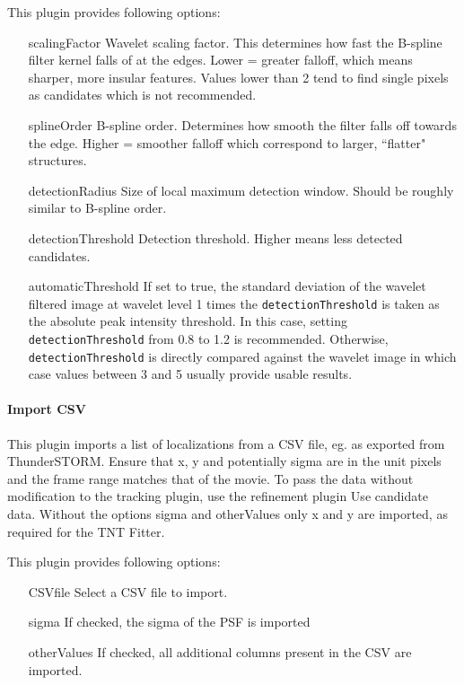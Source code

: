 \documentclass[11pt,onside]{report}
\numberwithin{equation}{chapter}
\begin{document}
This plugin provides following options:
\begin{itemize}[leftmargin=3cm]
\item[\textsf{scalingFactor}] Wavelet scaling factor. This determines how fast the B-spline filter kernel falls of at the edges. Lower = greater falloff, which means sharper, more insular features. Values lower than 2 tend to find single pixels as candidates which is not recommended.
\item[\textsf{splineOrder}] B-spline order. Determines how smooth the filter falls off towards the edge. Higher = smoother falloff which correspond to larger, ``flatter" structures.
\item[\textsf{detectionRadius}] Size of local maximum detection window. Should be roughly similar to B-spline order.
\item[\textsf{detectionThreshold}] Detection threshold. Higher means less detected candidates.
\item[\textsf{automaticThreshold}] If set to true, the standard deviation of the wavelet filtered image at wavelet level 1 times the \texttt{detectionThreshold} is taken as the absolute peak intensity threshold. In this case, setting \texttt{detectionThreshold} from 0.8 to 1.2 is recommended. Otherwise, \texttt{detectionThreshold} is directly compared against the wavelet image in which case values between 3 and 5 usually provide usable results.
\end{itemize}
\paragraph{Import CSV}
This plugin imports a list of localizations from a CSV file, eg. as exported from ThunderSTORM. Ensure that x, y and potentially sigma are in the unit pixels and the frame range matches that of the movie. To pass the data without modification to the tracking plugin, use the refinement plugin \textsf{Use candidate data}. Without the options \textsf{sigma} and \textsf{otherValues} only x and y are imported, as required for the TNT Fitter.

This plugin provides following options:
\begin{itemize}[leftmargin=3cm]
	\item[\textsf{CSVfile}] Select a CSV file to import.
	\item[\textsf{sigma}] If checked, the sigma of the PSF is imported
	\item[\textsf{otherValues}] If checked, all additional columns present in the CSV are imported.
\end{itemize}
\end{document}
